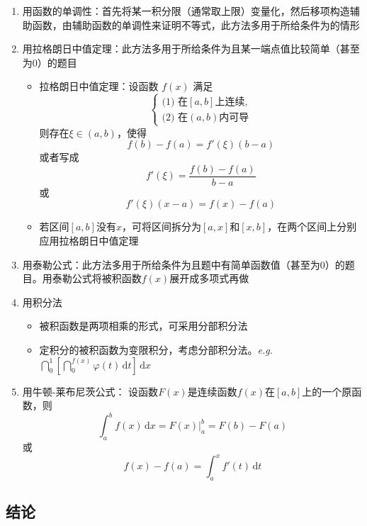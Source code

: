 \documentclass[../book.tex]{subfiles}
\begin{document}
    \begin{enumerate}
        \item 用函数的单调性：首先将某一积分限（通常取上限）变量化，然后移项构造辅助函数，由辅助函数的单调性来证明不等式，此方法多用于所给条件为\textbf{}的情形
        \item 用拉格朗日中值定理：此方法多用于所给条件为\textbf{}且某一端点值比较简单（甚至为$0$）的题目
        \begin{itemize}
            \item 拉格朗日中值定理：设函数 $f(x)$ 满足
            \[
                \begin{cases}
                    \text{(1) 在} [a, b] \text{上连续},\\
                    \text{(2) 在} (a, b) \text{内可导}
                \end{cases}
            \]
            则存在$\xi \in (a, b)$，使得
            \[
                f(b) - f(a) = f'(\xi)(b - a)
            \]
            或者写成
            \[
                f'(\xi) = \frac{f(b) - f(a)}{b - a}
            \]
            或
            \[
                f'(\xi)(x - a) = f(x) - f(a)
            \]
            \item 若区间$[a, b]$没有$x$，可将区间拆分为$[a, x]$和$[x, b]$，在两个区间上分别应用拉格朗日中值定理
        \end{itemize}
        \item 用泰勒公式：此方法多用于所给条件为\textbf{}且题中有简单函数值（甚至为$0$）的题目。用泰勒公式将被积函数$f(x)$展开成多项式再做
        \item 用积分法
        \begin{itemize}
            \item 被积函数是两项相乘的形式，可采用分部积分法
            \item 定积分的被积函数为变限积分，考虑分部积分法。\emph{e.g.} $\dint_0^1\left[\dint_0^{f(x)} \varphi(t)\,\mathrm{d}t\right]\,\mathrm{d}x$
        \end{itemize}
        \item 用牛顿-莱布尼茨公式：
        设函数$F(x)$是连续函数$f(x)$在$[a, b]$上的一个原函数，则
        \[
            \int_a^b f(x)\,\mathrm{d}x = F(x)\Big|_{a}^{b} = F(b) - F(a)
        \]或
        \[
            f(x) - f(a) = \int_a^x f'(t)\,\mathrm{d}t
        \]
    \end{enumerate}

    \subsection{结论}
\end{document}
